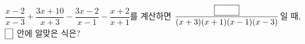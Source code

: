 $\dfrac{x-2}{x-3}+\dfrac{3x+10}{x+3}-\dfrac{3x-2}{x-1}-\dfrac{x+2}{x+1}$를 계산하면 $\dfrac{\blank[3em]}{(x+3)(x+1)(x-1)(x-3)}$일 때, $\blank[1em]$ 안에 알맞은 식은?
